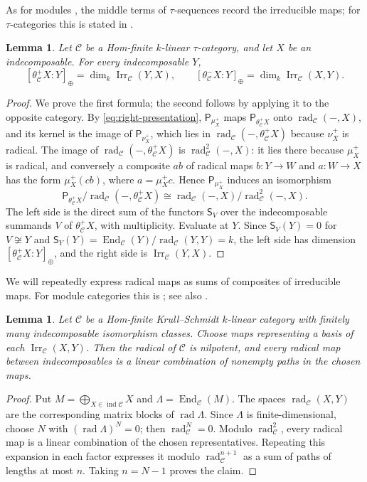 \documentclass[a4paper,reqno,10pt]{amsart}
\newtheorem{lemma}[theorem]{Lemma}
\theoremstyle{definition}
\numberwithin{equation}{section}
\DeclareMathOperator{\ind}{ind}
\DeclareMathOperator{\End}{End}
\DeclareMathOperator{\Irr}{Irr}
\DeclareMathOperator{\rad}{rad}
\newcommand{\cC}{\mathcal C}
\begin{document}
As for modules \cite[VII, Proposition~1.3]{ARS}, the middle terms of
\(\tau\)-sequences record the irreducible maps; for \(\tau\)-categories
this is stated in \cite[Section~9.1]{IyamaI}.
\begin{lemma}\label{lem:tau-multiplicity}
Let \(\cC\) be a Hom-finite \(k\)-linear \(\tau\)-category, and let
\(X\) be an indecomposable. For every indecomposable \(Y\),
\[
 [\theta_{\cC}^+X:Y]_\oplus=\dim_k\Irr_{\cC}(Y,X),\qquad
 [\theta_{\cC}^-X:Y]_\oplus=\dim_k\Irr_{\cC}(X,Y).
\]
\end{lemma}
\begin{proof}
We prove the first formula; the second follows by applying it to the
opposite category.
By \eqref{eq:right-presentation}, \(\mathsf P_{\mu_X^+}\) maps
\(\mathsf P_{\theta_{\cC}^+X}\) onto \(\rad_{\cC}(-,X)\), and its kernel is the image
of \(\mathsf P_{\nu_X^+}\), which lies in \(\rad_{\cC}(-,\theta_{\cC}^+X)\) because
\(\nu_X^+\) is radical. The image of \(\rad_{\cC}(-,\theta_{\cC}^+X)\) is
\(\rad_{\cC}^2(-,X)\): it lies there because \(\mu_X^+\) is radical, and
conversely a composite \(ab\) of radical maps \(b:Y\to W\) and
\(a:W\to X\) has the form \(\mu_X^+(cb)\), where \(a=\mu_X^+c\). Hence
\(\mathsf P_{\mu_X^+}\) induces an isomorphism
\[
 \mathsf P_{\theta_{\cC}^+X}/\rad_{\cC}(-,\theta_{\cC}^+X)\cong
 \rad_{\cC}(-,X)/\rad_{\cC}^2(-,X).
\]
The left side is the direct sum of the functors \(\mathsf S_V\) over the
indecomposable summands \(V\) of \(\theta_{\cC}^+X\), with multiplicity. Evaluate
at \(Y\). Since \(\mathsf S_V(Y)=0\) for \(V\not\cong Y\) and
\(\mathsf S_Y(Y)=\End_{\cC}(Y)/\rad_{\cC}(Y,Y)=k\), the left side has
dimension \([\theta_{\cC}^+X:Y]_\oplus\), and the right side is
\(\Irr_{\cC}(Y,X)\).
\end{proof}

We will repeatedly express radical maps as sums of composites of
irreducible maps. For module categories this is
\cite[V, Theorem~7.8]{ARS}; see also \cite[IV, Corollary~5.6]{ASS}.
\begin{lemma}\label{lem:path-expansion}
Let \(\cC\) be a Hom-finite Krull--Schmidt \(k\)-linear category with finitely
many indecomposable isomorphism classes. Choose maps representing a basis
of each \(\Irr_{\cC}(X,Y)\). Then the radical of \(\cC\) is nilpotent, and every
radical map between indecomposables is a linear combination of nonempty
paths in the chosen maps.
\end{lemma}
\begin{proof}
Put \(M=\bigoplus_{X\in\ind\cC}X\) and \(\Lambda=\End_{\cC}(M)\).
The spaces \(\rad_{\cC}(X,Y)\) are the corresponding matrix blocks of
\(\rad\Lambda\). Since \(\Lambda\) is finite-dimensional, choose \(N\)
with \((\rad\Lambda)^N=0\); then \(\rad_{\cC}^N=0\).
Modulo \(\rad_{\cC}^2\), every radical map
is a linear combination of the chosen representatives. Repeating this
expansion in each factor expresses it modulo \(\rad_{\cC}^{n+1}\)
as a sum of paths of lengths at most \(n\). Taking \(n=N-1\) proves the claim.
\end{proof}
\end{document}
